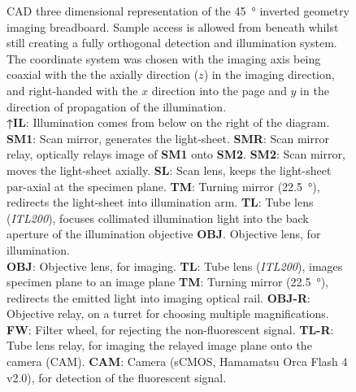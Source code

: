 \begin{figure}
        \ContinuedFloat{}
    \caption[\gls{CAD} three dimensional representation of the \SI{45}{\degree} inverted geometry imaging breadboard]{
    \gls{CAD} three dimensional representation of the \SI{45}{\degree} inverted geometry imaging breadboard.
    Sample access is allowed from beneath whilst still creating a fully orthogonal detection and illumination system.
    The coordinate system was chosen with the imaging axis being coaxial with the the axially direction (\(z\)) in the imaging direction, and right-handed with the \(x\) direction into the page and \(y\) in the direction of propagation of the illumination.\\
    \textcolor{illustrator_green}{\textbf{↑IL}}: Illumination comes from below on the right of the diagram.
    \textcolor{illustrator_green}{\textbf{SM1}}: Scan mirror, generates the \gls{light-sheet}.
    \textcolor{illustrator_green}{\textbf{SMR}}: Scan mirror relay, optically relays image of \textcolor{illustrator_green}{\textbf{SM1}} onto \textcolor{illustrator_green}{\textbf{SM2}}.
    \textcolor{illustrator_green}{\textbf{SM2}}: Scan mirror, moves the \gls{light-sheet} axially.
    \textcolor{illustrator_green}{\textbf{SL}}: Scan lens, keeps the \gls{light-sheet} par-axial at the specimen plane.
    \textcolor{illustrator_green}{\textbf{TM}}: Turning mirror (\SI{22.5}{\degree}), redirects the \gls{light-sheet} into \gls{illumination arm}.
    \textcolor{illustrator_green}{\textbf{TL}}: Tube lens (\emph{ITL200}), focuses collimated illumination light into the back aperture of the illumination objective \textcolor{illustrator_green}{\textbf{OBJ}}. Objective lens, for illumination.\\
    \textcolor{illustrator_red}{\textbf{OBJ}}: Objective lens, for imaging.
    \textcolor{illustrator_red}{\textbf{TL}}: Tube lens (\emph{ITL200}), images specimen plane to an image plane
    \textcolor{illustrator_red}{\textbf{TM}}: Turning mirror (\SI{22.5}{\degree}), redirects the emitted light into \gls{imaging optical rail}.
    \textcolor{illustrator_red}{\textbf{OBJ-R}}: Objective relay, on a turret for choosing multiple magnifications.
    \textcolor{illustrator_red}{\textbf{FW}}: Filter wheel, for rejecting the non-fluorescent signal.
    \textcolor{illustrator_red}{\textbf{TL-R}}: Tube lens relay, for imaging the relayed image plane onto the camera (CAM).
    \textcolor{illustrator_red}{\textbf{CAM}}: Camera (sCMOS, Hamamatsu Orca Flash 4 v2.0), for detection of the fluorescent signal.
    }\label{fig:spim_cad}
\end{figure}
